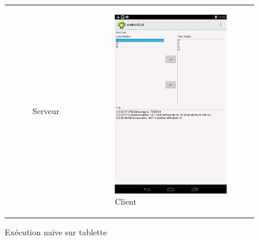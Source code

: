 \begin{figure}
\begin{tabular}{rl}
\begin{subfigure}{0.5\textwidth}
			\caption{Serveur}
		\end{subfigure}
		 &
		\begin{subfigure}{0.5\textwidth}
			\centering
			\includegraphics[scale=0.22]{images/resultats/client_simple_wifi.png}
			\caption{Client}
		\end{subfigure}
		\end{tabular}
		
		\caption{Exécution naïve sur tablette}
		\label{fig.androSimpl}
	\end{figure}
	
